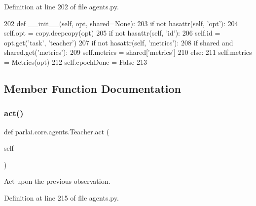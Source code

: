 Definition at line 202 of file agents.\+py.


\begin{DoxyCode}
202     \textcolor{keyword}{def }\_\_init\_\_(self, opt, shared=None):
203         \textcolor{keywordflow}{if} \textcolor{keywordflow}{not} hasattr(self, \textcolor{stringliteral}{'opt'}):
204             self.opt = copy.deepcopy(opt)
205         \textcolor{keywordflow}{if} \textcolor{keywordflow}{not} hasattr(self, \textcolor{stringliteral}{'id'}):
206             self.id = opt.get(\textcolor{stringliteral}{'task'}, \textcolor{stringliteral}{'teacher'})
207         \textcolor{keywordflow}{if} \textcolor{keywordflow}{not} hasattr(self, \textcolor{stringliteral}{'metrics'}):
208             \textcolor{keywordflow}{if} shared \textcolor{keywordflow}{and} shared.get(\textcolor{stringliteral}{'metrics'}):
209                 self.metrics = shared[\textcolor{stringliteral}{'metrics'}]
210             \textcolor{keywordflow}{else}:
211                 self.metrics = Metrics(opt)
212         self.epochDone = \textcolor{keyword}{False}
213 
\end{DoxyCode}


\subsection{Member Function Documentation}
\mbox{\label{classparlai_1_1core_1_1agents_1_1Teacher_a3f4cbdfdddddb8776ab665f5f7ee63d6}} 
\subsubsection{\texorpdfstring{act()}{act()}}
{\footnotesize\ttfamily def parlai.\+core.\+agents.\+Teacher.\+act (\begin{DoxyParamCaption}\item[{}]{self }\end{DoxyParamCaption})}

\begin{DoxyVerb}Act upon the previous observation.
\end{DoxyVerb}
 

Definition at line 215 of file agents.\+py.


